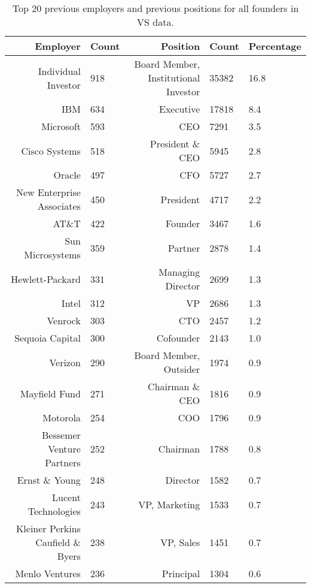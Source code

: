 \begin{table}[]
\centering
\begingroup\normalsize
\begin{tabular}{rlrll}
  \toprule
Employer & Count & Position & Count & Percentage \\ 
  \midrule
Individual Investor & 918 & Board Member, Institutional Investor & 35382 & 16.8 \\ 
  IBM & 634 & Executive & 17818 & 8.4 \\ 
  Microsoft & 593 & CEO & 7291 & 3.5 \\ 
  Cisco Systems & 518 & President \& CEO & 5945 & 2.8 \\ 
  Oracle & 497 & CFO & 5727 & 2.7 \\ 
  New Enterprise Associates & 450 & President & 4717 & 2.2 \\ 
  AT\&T & 422 & Founder & 3467 & 1.6 \\ 
  Sun Microsystems & 359 & Partner & 2878 & 1.4 \\ 
  Hewlett-Packard & 331 & Managing Director & 2699 & 1.3 \\ 
  Intel & 312 & VP & 2686 & 1.3 \\ 
  Venrock & 303 & CTO & 2457 & 1.2 \\ 
  Sequoia Capital & 300 & Cofounder & 2143 & 1.0 \\ 
  Verizon & 290 & Board Member, Outsider & 1974 & 0.9 \\ 
  Mayfield Fund & 271 & Chairman \& CEO & 1816 & 0.9 \\ 
  Motorola & 254 & COO & 1796 & 0.9 \\ 
  Bessemer Venture Partners & 252 & Chairman & 1788 & 0.8 \\ 
  Ernst \& Young & 248 & Director & 1582 & 0.7 \\ 
  Lucent Technologies & 243 & VP, Marketing & 1533 & 0.7 \\ 
  Kleiner Perkins Caufield \& Byers & 238 & VP, Sales & 1451 & 0.7 \\ 
  Menlo Ventures & 236 & Principal & 1304 & 0.6 \\ 
   \bottomrule
\end{tabular}
\endgroup
\caption{Top 20 previous employers and previous positions for all founders in VS data.} 
\label{table:VS_previousEmployersSummaryTable}
\end{table}
